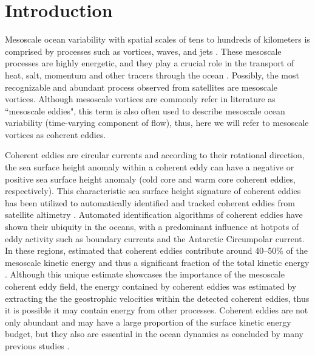 \documentclass[draft,linenumbers]{agujournal2019}
\begin{document}
	
\section{Introduction}

Mesoscale ocean variability with spatial scales of tens to hundreds of kilometers is comprised by processes such as vortices, waves, and jets \citep{Ferrari_energy_2009, Fu_Eddy_2010}. 
These mesoscale processes are highly energetic, and they play a crucial role in the transport of heat, salt, momentum and other tracers through the ocean \citep{Wunsch_energetics_2004, Wyrtki_Eddy_1976, Gill_Energy_1974}. Possibly, the most recognizable and abundant process observed from satellites are mesoscale vortices. Although mesoscale vortices are commonly refer in literature as ``mesoscale eddies", this term is also often used to describe mesoscale ocean variability (time-varying component of flow), thus, here we will refer to mesoscale vortices as coherent eddies. 


Coherent eddies are circular currents and according to their rotational direction, the sea surface height anomaly within a coherent eddy can have a negative or positive sea surface height anomaly (cold core and warm core coherent eddies, respectively). 
This characteristic sea surface height signature of coherent eddies has been utilized to automatically identified and tracked coherent eddies from satellite altimetry \citep{Cui_eddy_identification_2020,Martinez_Kinetic_2019, Ashkezari_eddies_2016, Faghmous_A_2015,Chelton_Global_2007}. 
Automated identification algorithms of coherent eddies have shown their ubiquity in the oceans, with a predominant influence at hotpots of eddy activity such as boundary currents and the Antarctic Circumpolar current. In these regions, \citet{Chelton_The_2011} estimated that coherent eddies contribute around 40--50\% of the mesoscale kinetic energy \citep{Chelton_The_2011} and thus a significant fraction of the total kinetic energy \citep{Ferrari_energy_2009}. Although this unique estimate showcases the importance of the mesoscale coherent eddy field, the energy contained by coherent eddies was estimated by extracting the the geostrophic velocities within the detected coherent eddies, thus it is possible it may contain energy from other processes. Coherent eddies are not only abundant and may have a large proportion of the surface kinetic energy budget, but they also are essential in the ocean dynamics as concluded by many previous studies \citep{Patel_SO_eddies_2020,Schubert_submesoscale_2019,Pilo_eddy_2015,Frenger_Southern_2015,Frenger_Imprint_2013,BeronVera_Agulhas_2013,Siegel_Bio_2011,Hogg_Interdecadal_2006}.
\end{document}
